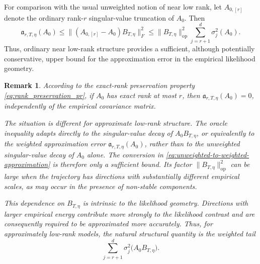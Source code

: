 \documentclass[11pt]{article}
\newtheorem{remark}[theorem]{Remark}
\begin{document}
For comparison with the usual unweighted notion of near low rank, let
$A_{0,[r]}$ denote the ordinary rank-$r$ singular-value truncation of $A_0$.
Then
\begin{equation}
    \mathfrak a_{r,T,\eta}(A_0)
    \leq
    \big\|(A_{0,[r]}-A_0)B_{T,\eta}\big\|_F^2
    \leq
    \|B_{T,\eta}\|_{\mathrm{op}}^2
    \sum_{j=r+1}^d\sigma_j^2(A_0).
\label{eq:unweighted-to-weighted-approximation}
\end{equation}
Thus, ordinary near low-rank structure provides a sufficient, although
potentially conservative, upper bound for the approximation error in the
empirical likelihood geometry. 

\begin{remark}
\label{rem:weighted-near-low-rank}
According to the exact-rank preservation property \eqref{eq:rank_preservation_pr}, if $A_0$ has exact rank at most $r$, then
$\mathfrak a_{r,T,\eta}(A_0)=0$, independently of the empirical covariance
matrix.

The situation is different for approximate low-rank structure. The oracle
inequality adapts directly to the singular-value decay of
$A_0B_{T,\eta}$, or equivalently to the weighted approximation error
$\mathfrak a_{r,T,\eta}(A_0)$, rather than to the unweighted singular-value
decay of $A_0$ alone. The conversion in
\eqref{eq:unweighted-to-weighted-approximation} is therefore only a sufficient
bound. Its factor $\|B_{T,\eta}\|_{\mathrm{op}}^2$ can be large when the
trajectory has directions with substantially different empirical scales, as may
occur in the presence of non-stable components.

This dependence on $B_{T,\eta}$ is intrinsic to the likelihood geometry. Directions with larger empirical energy contribute more
strongly to the likelihood contrast and are consequently required to be
approximated more accurately. Thus, for approximately low-rank models, the
natural structural quantity is the weighted tail
\[
    \sum_{j=r+1}^d
    \sigma_j^2\big(A_0B_{T,\eta}\big).
\]
\end{remark}
\end{document}
